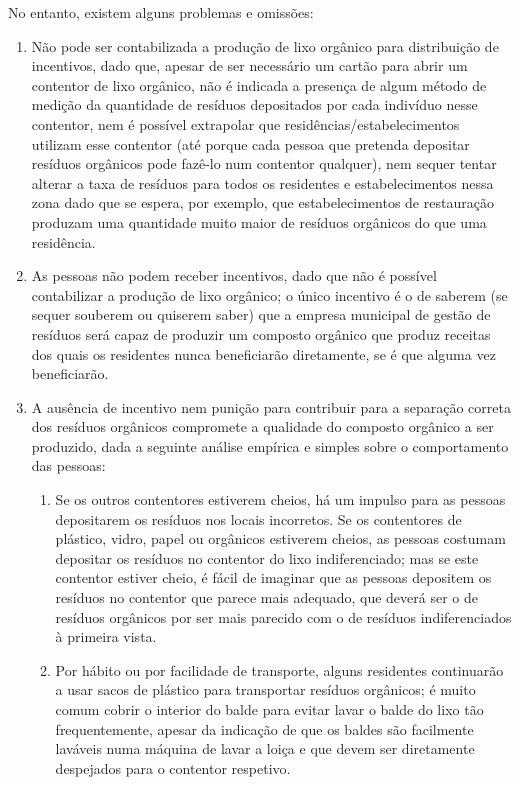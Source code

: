 \documentclass[11pt, a4paper, oneside]{book}
\begin{document}
No entanto, existem alguns problemas e omissões:

\begin{enumerate}

    \item Não pode ser contabilizada a produção de lixo orgânico para distribuição de incentivos, dado que, apesar de ser necessário um cartão para abrir um contentor de lixo orgânico, não é indicada a presença de algum método de medição da quantidade de resíduos depositados por cada indivíduo nesse contentor, nem é possível extrapolar que residências/estabelecimentos utilizam esse contentor (até porque cada pessoa que pretenda depositar resíduos orgânicos pode fazê-lo num contentor qualquer), nem sequer tentar alterar a taxa de resíduos para todos os residentes e estabelecimentos nessa zona dado que se espera, por exemplo, que estabelecimentos de restauração produzam uma quantidade muito maior de resíduos orgânicos do que uma residência.

    \item As pessoas não podem receber incentivos, dado que não é possível contabilizar a produção de lixo orgânico; o único incentivo é o de saberem (se sequer souberem ou quiserem saber) que a empresa municipal de gestão de resíduos será capaz de produzir um composto orgânico que produz receitas dos quais os residentes nunca beneficiarão diretamente, se é que alguma vez beneficiarão.

    \item A ausência de incentivo nem punição para contribuir para a separação correta dos resíduos orgânicos compromete a qualidade do composto orgânico a ser produzido, dada a seguinte análise empírica e simples sobre o comportamento das pessoas:
    \begin{enumerate}
        \item Se os outros contentores estiverem cheios, há um impulso para as pessoas depositarem os resíduos nos locais incorretos. Se os contentores de plástico, vidro, papel ou orgânicos estiverem cheios, as pessoas costumam depositar os resíduos no contentor do lixo indiferenciado; mas se este contentor estiver cheio, é fácil de imaginar que as pessoas depositem os resíduos no contentor que parece mais adequado, que deverá ser o de resíduos orgânicos por ser mais parecido com o de resíduos indiferenciados à primeira vista.
        \item Por hábito ou por facilidade de transporte, alguns residentes continuarão a usar sacos de plástico para transportar resíduos orgânicos; é muito comum cobrir o interior do balde para evitar lavar o balde do lixo tão frequentemente, apesar da indicação de que os baldes são facilmente laváveis numa máquina de lavar a loiça e que devem ser diretamente despejados para o contentor respetivo.
    \end{enumerate}
\end{enumerate}
\end{document}
